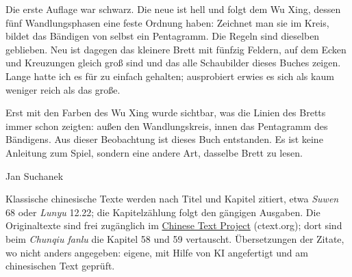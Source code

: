 \documentclass[12pt,paper=a5,DIV=13,headings=small,twoside=true,open=any]{scrbook}
\newlength{\normalparindent}
\newenvironment{einleitung}
  {\par\justifying\setlength{\parindent}{\normalparindent}\setlength{\parskip}{0pt}}
  {\par}
\begin{document}
\begin{einleitung}
Die erste Auflage war schwarz. Die neue ist hell und folgt dem Wu Xing, dessen fünf Wandlungsphasen eine feste Ordnung haben: Zeichnet man sie im Kreis, bildet das Bändigen von selbst ein Pentagramm. Die Regeln sind dieselben geblieben. Neu ist dagegen das kleinere Brett mit fünfzig Feldern, auf dem Ecken und Kreuzungen gleich groß sind und das alle Schaubilder dieses Buches zeigen. Lange hatte ich es für zu einfach gehalten; ausprobiert erwies es sich als kaum weniger reich als das große.

Erst mit den Farben des Wu Xing wurde sichtbar, was die Linien des Bretts immer schon zeigten: außen den Wandlungskreis, innen das Pentagramm des Bändigens. Aus dieser Beobachtung ist dieses Buch entstanden. Es ist keine Anleitung zum Spiel, sondern eine andere Art, dasselbe Brett zu lesen.

\smallskip
\hfill Jan Suchanek
\end{einleitung}

\newpage


\begin{einleitung}
Klassische chinesische Texte werden nach Titel und Kapitel zitiert, etwa \textit{Suwen} 68 oder \textit{Lunyu} 12.22; die Kapitelzählung folgt den gängigen Ausgaben. Die Originaltexte sind frei zugänglich im \href{https://ctext.org}{Chinese Text Project} (ctext.org); dort sind beim \textit{Chunqiu fanlu} die Kapitel 58 und 59 vertauscht. Übersetzungen der Zitate, wo nicht anders angegeben: eigene, mit Hilfe von KI angefertigt und am chinesischen Text geprüft.
\end{einleitung}

\end{document}
